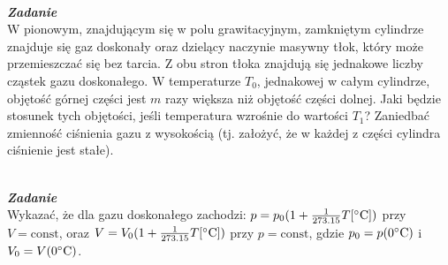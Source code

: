 \documentclass[11pt,a4paper]{article}
\newcounter{zadanie}\newcommand{\zadanie}[1][]{\addtocounter{zadanie}{1} ~\\  {\bf \emph{Zadanie \arabic{zadanie} #1 }} \\}
\begin{document}
\zadanie
W pionowym, znajdującym się w polu grawitacyjnym, zamkniętym cylindrze znajduje się gaz doskonały oraz dzielący naczynie masywny tłok, który może przemieszczać się bez tarcia. Z obu stron tłoka znajdują się jednakowe liczby cząstek gazu doskonałego. W temperaturze $T_0$, jednakowej w całym cylindrze, objętość górnej części jest $m$ razy większa niż objętość części dolnej. Jaki będzie stosunek tych objętości, jeśli temperatura wzrośnie do wartości $T_1$? Zaniedbać zmienność ciśnienia gazu z wysokością (tj. założyć, że w każdej z części cylindra ciśnienie jest stałe).

\zadanie
Wykazać, że dla gazu doskonałego zachodzi: $p = p_0 (1 + \frac{1}{273.15} T[\degree \textrm{C}])$ przy $V = \textrm{const}$,
oraz $V = V_0 (1+ \frac{1}{273.15}  T[\degree \textrm{C}])$ przy $p=\textrm{const}$, gdzie $p_0 =p(0\degree \textrm{C})$ i $V_0 =V(0\degree \textrm{C})$.

\vfill
\end{document}
